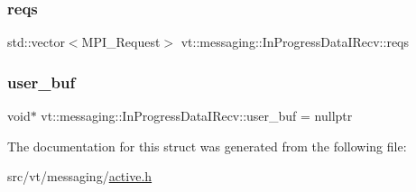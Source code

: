 \subsubsection{\texorpdfstring{reqs}{reqs}}
{\footnotesize\ttfamily std\+::vector$<$M\+P\+I\+\_\+\+Request$>$ vt\+::messaging\+::\+In\+Progress\+Data\+I\+Recv\+::reqs\hspace{0.3cm}{\ttfamily [private]}}

\mbox{\label{structvt_1_1messaging_1_1_in_progress_data_i_recv_abe6d7de2eeb0aaa8bd453a7cb24969a8}} 
\subsubsection{\texorpdfstring{user\+\_\+buf}{user\_buf}}
{\footnotesize\ttfamily void$\ast$ vt\+::messaging\+::\+In\+Progress\+Data\+I\+Recv\+::user\+\_\+buf = nullptr}



The documentation for this struct was generated from the following file\+:\begin{DoxyCompactItemize}
\item 
src/vt/messaging/\hyperlink{active_8h}{active.\+h}\end{DoxyCompactItemize}
